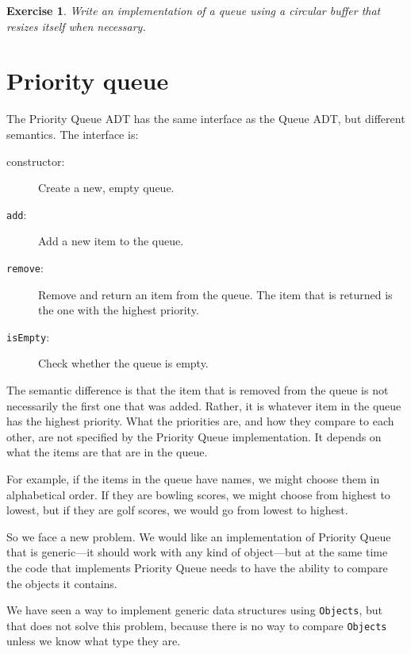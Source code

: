 \documentclass[12pt]{book}
\theoremstyle{exercise}
\newtheorem{exercise}{Exercise}[chapter]
\begin{document}
\begin{exercise}
Write an implementation of a queue using a circular buffer that
resizes itself when necessary.
\end{exercise}


\section{Priority queue}

The Priority Queue ADT has the same interface as
the Queue ADT, but different semantics.  The interface is:

\begin{description}

\item[constructor:] Create a new, empty queue.

\item[{\tt add}:] Add a new item to the queue.

\item[{\tt remove}:] Remove and return an item from the queue.  The item
that is returned is the one with the highest priority.

\item[{\tt isEmpty}:] Check whether the queue is empty.

\end{description}

The semantic difference is that the item that is removed from
the queue is not necessarily the first one that was added.  Rather,
it is whatever item in the queue has the highest priority.
What the priorities are, and how they compare to each other, are not
specified by the Priority Queue implementation.  It depends on
what the items are that are in the queue.

For example, if the items in the queue have names, we might choose
them in alphabetical order.  If they are bowling scores, we might
choose from highest to lowest, but if they are golf scores, we would
go from lowest to highest.


So we face a new problem.  We would like an implementation of
Priority Queue that is generic---it should work with any kind
of object---but at the same time the code that implements Priority
Queue needs to have the ability to compare the objects it contains.

We have seen a way to implement generic data structures using
{\tt Objects}, but that does not solve this problem, because
there is no way to compare {\tt Objects} unless we know what type
they are.
\end{document}
